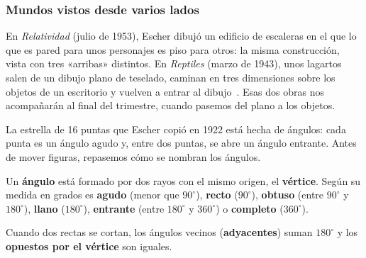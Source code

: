 \documentclass[11pt]{article}
\begin{document}
\subsubsection*{Mundos vistos desde varios lados}

En \emph{Relatividad} (julio de 1953), Escher dibujó un edificio de escaleras en el que lo que es
pared para unos personajes es piso para otros: la misma construcción, vista con tres «arribas»
distintos. En \emph{Reptiles} (marzo de 1943), unos lagartos salen de un dibujo plano de
teselado, caminan en tres dimensiones sobre los objetos de un escritorio y vuelven a entrar al
dibujo~\cite{mcescher}. Esas dos obras nos acompañarán al final del trimestre, cuando pasemos
del plano a los objetos.

\label{tema:angulos}

\begin{hilo}
La estrella de 16 puntas que Escher copió en 1922 está hecha de ángulos: cada punta es un ángulo
agudo y, entre dos puntas, se abre un ángulo entrante. Antes de mover figuras, repasemos cómo se
nombran los ángulos.
\end{hilo}

\begin{definicion}
Un \textbf{ángulo} está formado por dos rayos con el mismo origen, el \textbf{vértice}. Según su
medida en grados es \textbf{agudo} (menor que $90^\circ$), \textbf{recto} ($90^\circ$),
\textbf{obtuso} (entre $90^\circ$ y $180^\circ$), \textbf{llano} ($180^\circ$),
\textbf{entrante} (entre $180^\circ$ y $360^\circ$) o \textbf{completo} ($360^\circ$).
\end{definicion}

Cuando dos rectas se cortan, los ángulos vecinos (\textbf{adyacentes}) suman $180^\circ$ y los
\textbf{opuestos por el vértice} son iguales.

\begin{center}
\end{center}
\end{document}
